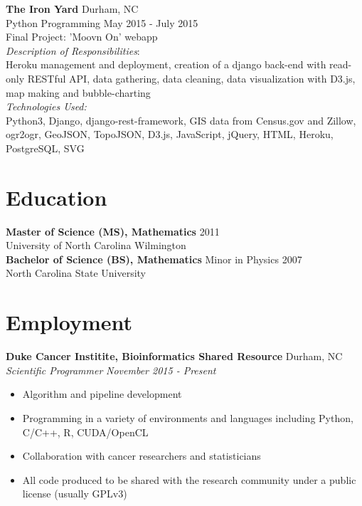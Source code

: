\documentclass[11pt]{article}
\begin{document}
{\bf The Iron Yard} \hfill Durham, NC\\
Python Programming \hfill {May 2015 - July 2015}
\vspace{5pt}\\
Final Project: 'Moovn On' webapp\\
{\it Description of Responsibilities}:\\
Heroku management and deployment, creation of a django back-end with read-only RESTful API, data gathering, data cleaning, data visualization with D3.js, map making and bubble-charting\\
{\it Technologies Used:}\\
Python3, Django, django-rest-framework, GIS data from Census.gov and Zillow, ogr2ogr, GeoJSON, TopoJSON, D3.js, JavaScript, jQuery, HTML, Heroku, PostgreSQL, SVG


\section*{Education}

{\bf Master of Science (MS), Mathematics} \hfill 2011\\
University of North Carolina Wilmington
\vspace{5pt}\\
\noindent
{\bf Bachelor of Science (BS), Mathematics} Minor in Physics \hfill 2007\\
North Carolina State University


\section*{Employment}

\noindent
{\bf Duke Cancer Institite, Bioinformatics Shared Resource} \hfill Durham, NC\\
{\it Scientific Programmer} \hfill {\it November 2015 - Present}

\begin{itemize}
\setlength{\itemsep}{1pt}

\item Algorithm and pipeline development

\item Programming in a variety of environments and languages including
Python, C/C++, R, CUDA/OpenCL

\item Collaboration with cancer researchers and statisticians

\item All code produced to be shared with the research community under
a public license (usually GPLv3)

\end{itemize}
\vspace{10pt}
\end{document}
